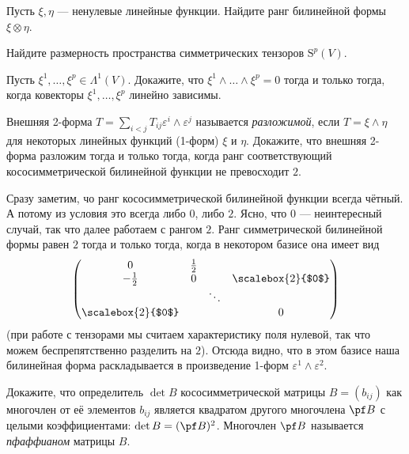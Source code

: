 \begin{problem}
    Пусть $\xi, \eta$ --- ненулевые линейные функции. Найдите ранг билинейной формы $\xi \otimes \eta$.
\end{problem}

\begin{problem}
    Найдите размерность пространства симметрических тензоров $\mathrm{S}^p(V)$.
\end{problem}

\begin{problem}
    Пусть $\xi^1, \ldots, \xi^p \in \Lambda^1(V)$. Докажите, что $\xi^1 \wedge \ldots \wedge \xi^p = 0$ тогда и только тогда, когда ковекторы $\xi^1, \ldots, \xi^p$ линейно зависимы.
\end{problem}

\begin{problem}
    Внешняя 2-форма $T = \sum\limits_{i < j}T_{ij}\varepsilon^i \wedge \varepsilon^j$ называется \textit{разложимой}, если $T = \xi \wedge \eta$ для некоторых линейных функций (1-форм) $\xi$ и $\eta$. Докажите, что внешняя 2-форма разложим тогда и только тогда, когда ранг соответствующий кососимметрической билинейной функции не превосходит $2$.
\end{problem}

\begin{solution}
    Сразу заметим, чо ранг кососимметрической билинейной функции всегда чётный. А потому из условия это всегда либо $0$, либо $2$. Ясно, что $0$ --- неинтересный случай, так что далее работаем с рангом $2$. Ранг симметрической билинейной формы равен $2$ тогда и только тогда, когда в некотором базисе она имеет вид
    \[
        \begin{pmatrix}
            0 & \frac{1}{2} & & \\
            -\frac{1}{2} & 0 & & \scalebox{2}{$0$} \\
             & & \ddots & \\
             \scalebox{2}{$0$} & & & 0
        \end{pmatrix}
    \]
    (при работе с тензорами мы считаем характеристику поля нулевой, так что можем беспрепятственно разделить на $2$). Отсюда видно, что в этом базисе наша билинейная форма раскладывается в произведение 1-форм $\varepsilon^1 \wedge \varepsilon^2$.
\end{solution}

\begin{problem}
    Докажите, что определитель $\det B$ кососимметрической матрицы $B = (b_{ij})$ как многочлен от её элементов $b_{ij}$ является квадратом другого многочлена $\pf B$ с целыми коэффициентами: $\det B = (\pf B)^2$. Многочлен $\pf B$ называется \textit{пфаффианом} матрицы $B$.
\end{problem}

